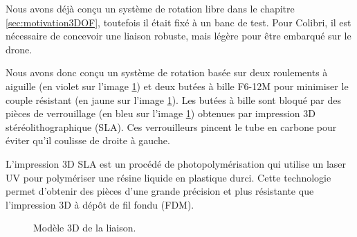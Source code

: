 {\color{blue}
    Nous avons déjà conçu un système de rotation libre dans le chapitre \ref{sec:motivation3DOF}, toutefois il était fixé à un banc de test. Pour Colibri, il est nécessaire de concevoir une liaison robuste, mais légère pour être embarqué sur le drone. 

    Nous avons donc conçu un système de rotation basée sur deux roulements à aiguille (en violet sur l'image \ref{fig:ColibriRot}) et deux butées à bille F6-12M pour minimiser le couple résistant (en jaune sur l'image \ref{fig:ColibriRot}). Les butées à  bille sont bloqué par des pièces de verrouillage (en bleu sur l'image \ref{fig:ColibriRot}) obtenues par impression 3D stéréolithographique (SLA). Ces verrouilleurs pincent le tube en carbone pour éviter qu'il coulisse de droite à gauche. 

    L'impression 3D SLA est un procédé de photopolymérisation qui utilise un laser UV pour polymériser une résine liquide en plastique durci. Cette technologie permet d'obtenir des pièces d'une grande précision et plus résistante que l'impression 3D à dépôt de fil fondu (FDM).

    



    \begin{figure}[ht!]
        \centering
        \caption{Modèle 3D de la liaison.}
        \label{fig:ColibriRot}
    \end{figure}

}
